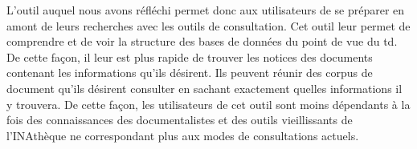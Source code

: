 L'outil auquel nous avons réfléchi permet donc aux utilisateurs de se préparer en amont de leurs recherches avec les outils de consultation. Cet outil leur permet de comprendre et de voir la structure des bases de données du point de vue du \gls{td}. De cette façon, il leur est plus rapide de trouver les notices des documents contenant les informations qu'ils désirent. Ils peuvent réunir des corpus de document qu'ils désirent consulter en sachant exactement quelles informations il y trouvera. De cette façon, les utilisateurs de cet outil sont moins dépendants à la fois des connaissances des documentalistes et des outils vieillissants de l'INAthèque ne correspondant plus aux modes de consultations actuels. 